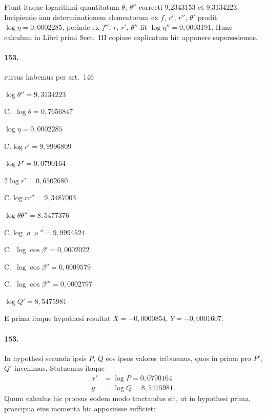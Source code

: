 \documentclass[12pt,a4paper]{article}
\begin{document}
Fiunt itaque logarithmi quantitatum $\theta$, $\theta''$ correcti 9,2343153 et 9,3134223. Incipiendo iam determinationem elementorum ex $f$, $r'$, $r''$, $\theta'$ prodit $\log\eta = 0,0002285$, perinde ex $f''$, $r$, $r'$, $\theta''$ fit $\log\eta'' = 0,0003191$. Hunc calculum in Libri primi Sect.~III copiose explicatum hic apponere supersedemus.

\paragraph{153.}
rursus habemus per art.~146

$\log\theta'' = 9,3134223$

C.~$\log\theta = 0,7656847$

$\log\eta = 0,0002285$

C.$\log r' = 9,9996809$

$\log P' = 0,0790164$

$2\log r' = 0,6502680$

C.$\log rr'' = 9,3487003$

$\log\theta\theta'' = 8,5477376$

C.$\log\varrho\varrho'' = 9,9994524$

C.~$\log\cos\beta' = 0,0002022$

C.~$\log\cos\beta'' = 0,0009579$

C.~$\log\cos\beta''' = 0,0002797$

$\log Q' = 8,5475981$

E prima itaque hypothesi resultat $X = -0,0000854$, $Y = -0,0001607$.

\paragraph{153.}
In hypothesi secunda ipsis $P$, $Q$ eos ipsos valores tribuemus, quos in prima pro $P'$, $Q'$ invenimus. Statuemus itaque
\begin{align*}
x' &= \log P = 0,0790164\\
y &= \log Q = 8,5475981.
\end{align*}
Quum calculus hic prorsus eodem modo tractandus sit, ut in hypothesi prima, praecipua eius momenta hic apposuisse sufficiet:
\end{document}
